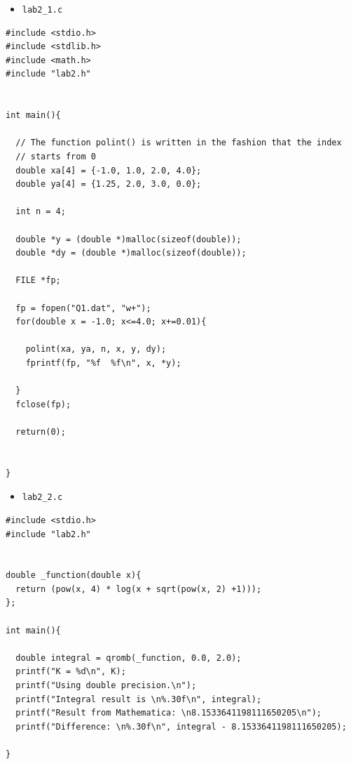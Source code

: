 \documentclass{article}
\begin{document}
\begin{itemize}
\item \texttt{lab2\_1.c}
\end{itemize}
\hline
\begin{verbatim}
#include <stdio.h>
#include <stdlib.h>
#include <math.h>
#include "lab2.h"


int main(){

  // The function polint() is written in the fashion that the index
  // starts from 0
  double xa[4] = {-1.0, 1.0, 2.0, 4.0};
  double ya[4] = {1.25, 2.0, 3.0, 0.0};

  int n = 4;

  double *y = (double *)malloc(sizeof(double));
  double *dy = (double *)malloc(sizeof(double));

  FILE *fp;

  fp = fopen("Q1.dat", "w+");
  for(double x = -1.0; x<=4.0; x+=0.01){

    polint(xa, ya, n, x, y, dy);
    fprintf(fp, "%f  %f\n", x, *y);

  }
  fclose(fp);

  return(0);


}
\end{verbatim}

\hline

\begin{itemize}
\item \texttt{lab2\_2.c}
\end{itemize}
\hline
\begin{verbatim}
#include <stdio.h>
#include "lab2.h"


double _function(double x){
  return (pow(x, 4) * log(x + sqrt(pow(x, 2) +1)));
};

int main(){

  double integral = qromb(_function, 0.0, 2.0);
  printf("K = %d\n", K);
  printf("Using double precision.\n");
  printf("Integral result is \n%.30f\n", integral);
  printf("Result from Mathematica: \n8.1533641198111650205\n");
  printf("Difference: \n%.30f\n", integral - 8.1533641198111650205);

}
\end{verbatim}

\hline
\end{document}
